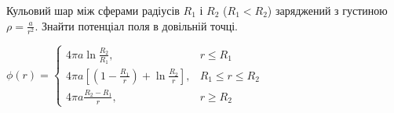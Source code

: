 

\begin{problem}
Кульовий шар між сферами радіусів $R_1$ і $R_2$ ($R_1 < R_2$) заряджений з густиною $\rho = \frac{a}{r^2}$. Знайти потенціал поля в довільній точці.
\begin{solution}
	$
		\phi(r) =
		\begin{cases}
			4\pi a\ln\frac{R_2}{R_1},                                                  & r \le R_1         \\
			4\pi a \left[ \left( 1- \frac{R_1}{r}\right)  + \ln\frac{R_2}{r} \right] , & R_1 \le r \le R_2 \\
			4\pi a \frac{R_2 - R_1}{r},                                                & r \ge R_2
		\end{cases}
	$
\end{solution}
\end{problem}

